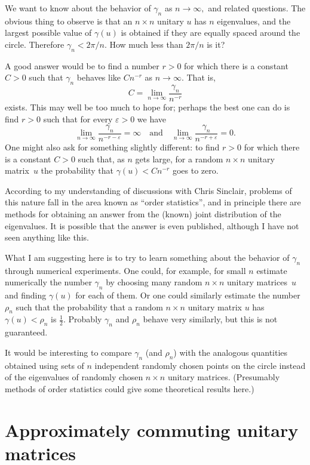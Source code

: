\documentclass[10pt]{amsart}
\theoremstyle{definition}
\newcommand{\limi}[1]{\lim_{{#1} \to \infty}}
\newcommand{\gm}{\gamma}
\newcommand{\ep}{\varepsilon}
\newcommand{\rh}{\rho}
\newcommand{\I}{\infty}
\newcommand{\andeqn}{\,\,\,\,\,\, {\mbox{and}} \,\,\,\,\,\,}
\begin{document}
We want to know about the behavior of $\gm_n$ as $n \to \I,$
and related questions.
The obvious thing to observe is that an $n \times n$ unitary $u$
has $n$ eigenvalues,
and the largest possible value of $\gm (u)$ is obtained if they are
equally spaced around the circle.
Therefore $\gm_n < 2 \pi / n.$
How much less than $2 \pi / n$ is it?

A good answer would be to find a number $r > 0$ for which there
is a constant $C > 0$ such that
$\gm_n$ behaves like $C n^{- r}$ as $n \to \I.$
That is,
\[
C = \limi{n} \frac{\gm_n}{n^{- r}}
\]
exists.
This may well be too much to hope for; perhaps the best one can do
is find $r > 0$ such that for every $\ep > 0$ we have
\[
\limi{n} \frac{\gm_n}{n^{- r - \ep}} = \I
\andeqn
\limi{n} \frac{\gm_n}{n^{- r + \ep}} = 0.
\]
One might also ask for something slightly different:
to find $r > 0$
for which there
is a constant $C > 0$ such that,
as $n$ gets large, for a random $n \times n$ unitary matrix~$u$
the probability that $\gm (u) < C n^{-r}$
goes to zero.

According to my understanding of discussions with Chris Sinclair,
problems of this nature fall in the area known as ``order statistics'',
and in principle there are methods for obtaining an answer
from the (known) joint distribution of the eigenvalues.
It is possible that the answer is even published,
although I have not seen anything like this.

What I am suggesting here is to try to learn something about
the behavior of $\gm_n$ through numerical experiments.
One could, for example,
for small $n$ estimate numerically the number $\gm_n$
by choosing many random $n \times n$ unitary matrices~$u$
and finding $\gm (u)$ for each of them.
Or one could similarly estimate the number $\rh_n$
such that the probability that a
random $n \times n$ unitary matrix $u$ has $\gm (u) < \rh_n$
is $\frac{1}{2}.$
Probably $\gm_n$ and $\rh_n$ behave very similarly,
but this is not guaranteed.

It would be interesting to compare $\gm_n$ (and $\rh_n$)
with the analogous quantities obtained
using sets of $n$ independent randomly chosen points
on the circle instead of the eigenvalues of randomly
chosen $n \times n$ unitary matrices.
(Presumably methods of order statistics could give some
theoretical results here.)

\section{Approximately commuting unitary matrices}\label{Sec:ApproxComm}
\end{document}
